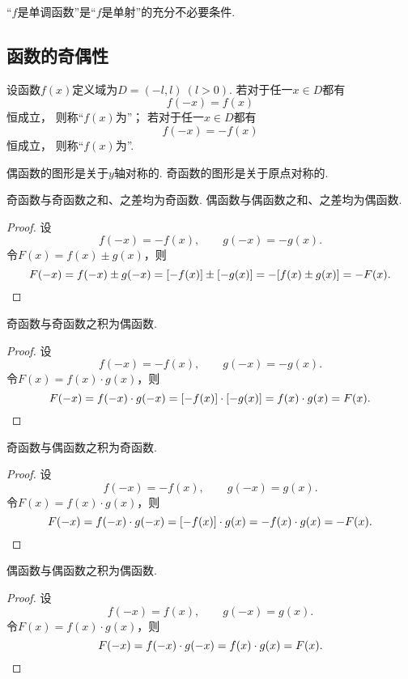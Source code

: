 \begin{proposition}
“\(f\)是单调函数”是“\(f\)是单射”的充分不必要条件.
\end{proposition}

\subsection{函数的奇偶性}
\begin{definition}
设函数\(f(x)\)定义域为\(D=(-l,l)\ (l>0)\).
若对于任一\(x \in D\)都有\[
	f(-x) = f(x)
\]恒成立，
则称“\(f(x)\)为”；
若对于任一\(x \in D\)都有\[
	f(-x) = -f(x)
\]恒成立，
则称“\(f(x)\)为”.
\end{definition}

\begin{property}
偶函数的图形是关于\(y\)轴对称的.
奇函数的图形是关于原点对称的.
\end{property}

\begin{property}
奇函数与奇函数之和、之差均为奇函数.
偶函数与偶函数之和、之差均为偶函数.
\begin{proof}
设\[
f(-x) = -f(x), \qquad g(-x) = -g(x).
\]令\(F(x) = f(x) \pm g(x)\)，则\[
F(-x) = f(-x) \pm g(-x)
= [-f(x)] \pm [-g(x)]
= -[f(x) \pm g(x)]
= -F(x).
\qedhere
\]
\end{proof}
\end{property}

\begin{property}
奇函数与奇函数之积为偶函数.
\begin{proof}
设\[
f(-x) = -f(x), \qquad g(-x) = -g(x).
\]令\(F(x) = f(x) \cdot g(x)\)，则\[
F(-x) = f(-x) \cdot g(-x)
= [-f(x)] \cdot [-g(x)]
= f(x) \cdot g(x)
= F(x).
\qedhere
\]
\end{proof}
\end{property}

\begin{property}
奇函数与偶函数之积为奇函数.
\begin{proof}
设\[
f(-x) = -f(x), \qquad g(-x) = g(x).
\]令\(F(x) = f(x) \cdot g(x)\)，则\[
F(-x) = f(-x) \cdot g(-x)
= [-f(x)] \cdot g(x)
= - f(x) \cdot g(x)
= - F(x).
\qedhere
\]
\end{proof}
\end{property}

\begin{property}
偶函数与偶函数之积为偶函数.
\begin{proof}
设\[
f(-x) = f(x), \qquad g(-x) = g(x).
\]令\(F(x) = f(x) \cdot g(x)\)，则\[
F(-x) = f(-x) \cdot g(-x) = f(x) \cdot g(x) = F(x).
\qedhere
\]
\end{proof}
\end{property}

